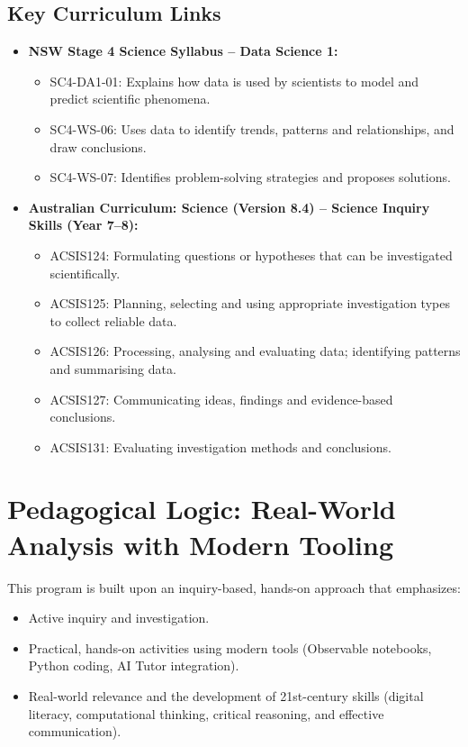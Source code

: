 \documentclass{tufte-book}
\begin{document}
\subsection*{Key Curriculum Links}
\begin{itemize}[leftmargin=*, label={--}]
    \item \textbf{NSW Stage 4 Science Syllabus -- Data Science 1:}
    \begin{itemize}[leftmargin=*, label={\textbullet}]
        \item SC4-DA1-01: Explains how data is used by scientists to model and predict scientific phenomena.
        \item SC4-WS-06: Uses data to identify trends, patterns and relationships, and draw conclusions.
        \item SC4-WS-07: Identifies problem-solving strategies and proposes solutions.
    \end{itemize}
    \item \textbf{Australian Curriculum: Science (Version 8.4) -- Science Inquiry Skills (Year 7--8):}
    \begin{itemize}[leftmargin=*, label={\textbullet}]
        \item ACSIS124: Formulating questions or hypotheses that can be investigated scientifically.
        \item ACSIS125: Planning, selecting and using appropriate investigation types to collect reliable data.
        \item ACSIS126: Processing, analysing and evaluating data; identifying patterns and summarising data.
        \item ACSIS127: Communicating ideas, findings and evidence-based conclusions.
        \item ACSIS131: Evaluating investigation methods and conclusions.
    \end{itemize}
\end{itemize}

\section*{Pedagogical Logic: Real-World Analysis with Modern Tooling}
This program is built upon an inquiry-based, hands-on approach that emphasizes:
\begin{itemize}[leftmargin=*, label={\textbullet}]
    \item Active inquiry and investigation.
    \item Practical, hands-on activities using modern tools (Observable notebooks, Python coding, AI Tutor integration).
    \item Real-world relevance and the development of 21st-century skills (digital literacy, computational thinking, critical reasoning, and effective communication).
\end{itemize}
\end{document}

